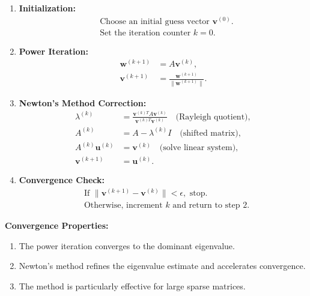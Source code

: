 \documentclass[journal,12pt,onecolumn]{IEEEtran}
\theoremstyle{remark}
\begin{document}
\begin{enumerate}
    \item \textbf{Initialization:}
    \begin{align*}
        &\text{Choose an initial guess vector } \mathbf{v}^{(0)}. \\
        &\text{Set the iteration counter } k = 0.
    \end{align*}
    
    \item \textbf{Power Iteration:}
    \begin{align*}
        \mathbf{w}^{(k+1)} &= A\mathbf{v}^{(k)}, \\
        \mathbf{v}^{(k+1)} &= \frac{\mathbf{w}^{(k+1)}}{\|\mathbf{w}^{(k+1)}\|}.
    \end{align*}
    
    \item \textbf{Newton's Method Correction:}
    \begin{align*}
        \lambda^{(k)} &= \frac{\mathbf{v}^{(k)T}A\mathbf{v}^{(k)}}{\mathbf{v}^{(k)T}\mathbf{v}^{(k)}} \quad \text{(Rayleigh quotient)}, \\
        A^{(k)} &= A - \lambda^{(k)}I \quad \text{(shifted matrix)}, \\
        A^{(k)}\mathbf{u}^{(k)} &= \mathbf{v}^{(k)} \quad \text{(solve linear system)}, \\
        \mathbf{v}^{(k+1)} &= \mathbf{u}^{(k)}.
    \end{align*}
    
    \item \textbf{Convergence Check:}
    \begin{align*}
        &\text{If } \| \mathbf{v}^{(k+1)} - \mathbf{v}^{(k)} \| < \epsilon, \text{ stop.} \\
        &\text{Otherwise, increment } k \text{ and return to step 2.}
    \end{align*}
\end{enumerate}

\textbf{Convergence Properties:}
\begin{enumerate}
    \item The power iteration converges to the dominant eigenvalue.
    \item Newton's method refines the eigenvalue estimate and accelerates convergence.
    \item The method is particularly effective for large sparse matrices.
\end{enumerate}
\end{document}
